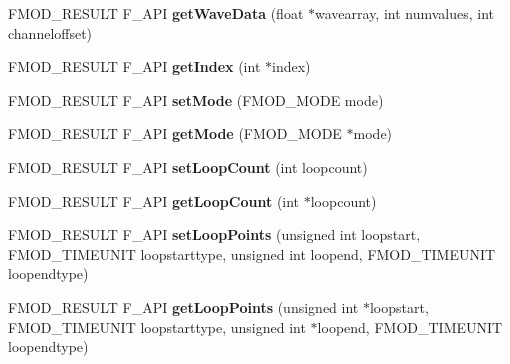 \begin{DoxyCompactItemize}
\item 
\hypertarget{class_f_m_o_d_1_1_channel_ad313289938f682ec0a4cf818a9f89966}{F\-M\-O\-D\-\_\-\-R\-E\-S\-U\-L\-T F\-\_\-\-A\-P\-I {\bfseries get\-Wave\-Data} (float $\ast$wavearray, int numvalues, int channeloffset)}\label{class_f_m_o_d_1_1_channel_ad313289938f682ec0a4cf818a9f89966}

\item 
\hypertarget{class_f_m_o_d_1_1_channel_ad1d410d1d16d0c153dd0af5de8fda88e}{F\-M\-O\-D\-\_\-\-R\-E\-S\-U\-L\-T F\-\_\-\-A\-P\-I {\bfseries get\-Index} (int $\ast$index)}\label{class_f_m_o_d_1_1_channel_ad1d410d1d16d0c153dd0af5de8fda88e}

\item 
\hypertarget{class_f_m_o_d_1_1_channel_a3fd338310b9d07f26d9934499235ccb5}{F\-M\-O\-D\-\_\-\-R\-E\-S\-U\-L\-T F\-\_\-\-A\-P\-I {\bfseries set\-Mode} (F\-M\-O\-D\-\_\-\-M\-O\-D\-E mode)}\label{class_f_m_o_d_1_1_channel_a3fd338310b9d07f26d9934499235ccb5}

\item 
\hypertarget{class_f_m_o_d_1_1_channel_a6965a6f0867195b4666101283319b2c6}{F\-M\-O\-D\-\_\-\-R\-E\-S\-U\-L\-T F\-\_\-\-A\-P\-I {\bfseries get\-Mode} (F\-M\-O\-D\-\_\-\-M\-O\-D\-E $\ast$mode)}\label{class_f_m_o_d_1_1_channel_a6965a6f0867195b4666101283319b2c6}

\item 
\hypertarget{class_f_m_o_d_1_1_channel_a7dc161cf3a929cd48da580634059f6a6}{F\-M\-O\-D\-\_\-\-R\-E\-S\-U\-L\-T F\-\_\-\-A\-P\-I {\bfseries set\-Loop\-Count} (int loopcount)}\label{class_f_m_o_d_1_1_channel_a7dc161cf3a929cd48da580634059f6a6}

\item 
\hypertarget{class_f_m_o_d_1_1_channel_a23128bf2475ef316e1c38a3606ccbfd0}{F\-M\-O\-D\-\_\-\-R\-E\-S\-U\-L\-T F\-\_\-\-A\-P\-I {\bfseries get\-Loop\-Count} (int $\ast$loopcount)}\label{class_f_m_o_d_1_1_channel_a23128bf2475ef316e1c38a3606ccbfd0}

\item 
\hypertarget{class_f_m_o_d_1_1_channel_abcac3fd6f8fb5a3f1097237a9ff00ee6}{F\-M\-O\-D\-\_\-\-R\-E\-S\-U\-L\-T F\-\_\-\-A\-P\-I {\bfseries set\-Loop\-Points} (unsigned int loopstart, F\-M\-O\-D\-\_\-\-T\-I\-M\-E\-U\-N\-I\-T loopstarttype, unsigned int loopend, F\-M\-O\-D\-\_\-\-T\-I\-M\-E\-U\-N\-I\-T loopendtype)}\label{class_f_m_o_d_1_1_channel_abcac3fd6f8fb5a3f1097237a9ff00ee6}

\item 
\hypertarget{class_f_m_o_d_1_1_channel_a32b040f752fc4fba7d46054ddbd6b913}{F\-M\-O\-D\-\_\-\-R\-E\-S\-U\-L\-T F\-\_\-\-A\-P\-I {\bfseries get\-Loop\-Points} (unsigned int $\ast$loopstart, F\-M\-O\-D\-\_\-\-T\-I\-M\-E\-U\-N\-I\-T loopstarttype, unsigned int $\ast$loopend, F\-M\-O\-D\-\_\-\-T\-I\-M\-E\-U\-N\-I\-T loopendtype)}\label{class_f_m_o_d_1_1_channel_a32b040f752fc4fba7d46054ddbd6b913}


\end{DoxyCompactItemize}
